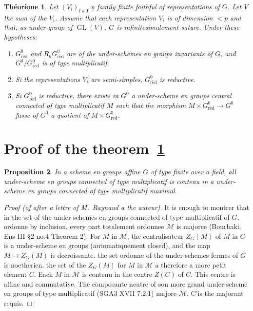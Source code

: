 \documentclass[11pt,a4paper]{article}
\theoremstyle{plain}
\newtheorem{theorem}{Th\'eor\`eme}[section]
\newtheorem{proposition}[theorem]{Proposition}
\theoremstyle{definition}
\DeclareMathOperator{\GL}{GL}
\newcommand{\red}{\mathrm{r\acute{e}d}}
\begin{document}
\begin{theorem}\label{thm:0.7}
Let $(V_i)_{i \in I}$ a family finite faithful of representations of $G$. Let $V$ the sum of the $V_i$. Assume that each representation $V_i$ is of dimension $< p$ and that, as under-group of $\GL(V)$, $G$ is infinitesimalement sature. Under these hypotheses:
\begin{enumerate}[label=(\roman*)]
\item $G^0_\red$ and $R_u G^0_\red$ are of the under-schemes en groups invariants of $G$, and $G^0/G^0_\red$ is of type multiplicatif.
\item Si the representations $V_i$ are semi-simples, $G^0_\red$ is reductive.
\item Si $G^0_\red$ is reductive, there exists in $G^0$ a under-scheme en groups central connected of type multiplicatif $M$ such that the morphism $M \times G^0_\red \to G^0$ fasse of $G^0$ a quotient of $M \times G^0_\red$.
\end{enumerate}
\end{theorem}

\section{Proof of the theorem~\ref{thm:0.7}}\label{sec:1}

\begin{proposition}\label{prop:1.1}
In a scheme en groups affine $G$ of type finite over a field, all under-scheme en groups connected of type multiplicatif is contenu in a under-scheme en groups connected of type multiplicatif maximal.
\end{proposition}

\begin{proof}[Proof (of after a lettre of M.\ Raynaud a the auteur)]
It is enough to montrer that in the set of the under-schemes en groups connected of type multiplicatif of $G$, ordonne by inclusion, every part totalement ordonnee $\mathcal{M}$ is majoree (Bourbaki, Ens III \S2 no.4 Theorem 2). For $M$ in $\mathcal{M}$, the centralisateur $Z_G(M)$ of $M$ in $G$ is a under-scheme en groups (automatiquement closed), and the map $M \mapsto Z_G(M)$ is decroissante. the set ordonne of the under-schemes fermes of $G$ is noetherien. the set of the $Z_G(M)$ for $M$ in $\mathcal{M}$ a therefore a more petit element $C$. Each $M$ in $\mathcal{M}$ is contenu in the centre $Z(C)$ of $C$. This centre is affine and commutative. The composante neutre of son more grand under-scheme en groups of type multiplicatif (SGA3 XVII 7.2.1) majore $\mathcal{M}$. C'is the majorant requis.
\end{proof}
\end{document}
